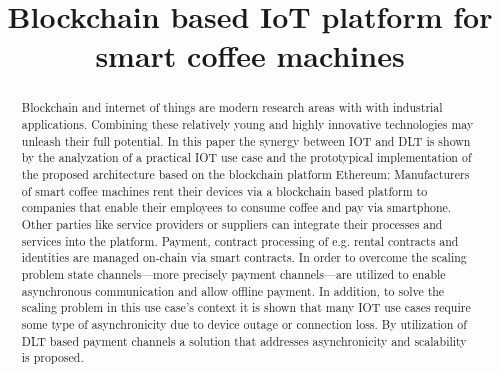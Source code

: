 \documentclass[conference]{IEEEtran}
\begin{document}
\title{Blockchain based IoT platform for smart coffee machines}

\author{

  \and


  \and

}

\maketitle

\begin{abstract}
Blockchain and internet of things are modern research areas with with industrial applications. Combining these relatively young and highly innovative technologies may unleash their full potential. In this paper the synergy between IOT and DLT is shown by the analyzation of a practical IOT use case and the prototypical implementation of the proposed architecture based on the blockchain platform Ethereum: Manufacturers of smart coffee machines rent their devices via a blockchain based platform to companies that enable their employees to consume coffee and pay via smartphone. Other parties like service providers or suppliers can integrate their processes and services into the platform. Payment, contract processing of e.g. rental contracts and identities are managed on-chain via smart contracts. In order to overcome the scaling problem state channels---more precisely payment channels---are utilized to enable asynchronous communication and allow offline payment. In addition, to solve the scaling problem in this use case's context it is shown that many IOT use cases require some type of asynchronicity due to device outage or connection loss. By utilization of DLT based payment channels a solution that addresses asynchronicity and scalability is proposed.
\end{abstract}
\end{document}
